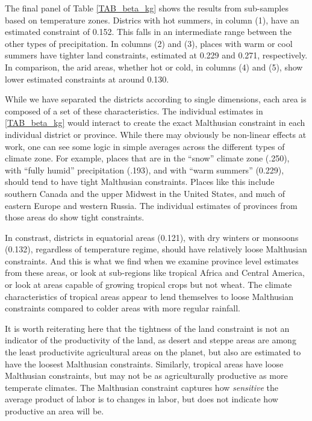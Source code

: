 \documentclass[11pt]{article}
\begin{document}
The final panel of Table \ref{TAB_beta_kg} shows the results from sub-samples based on temperature zones. Districs with hot summers, in column (1), have an estimated constraint of 0.152. This falls in an intermediate range between the other types of precipitation. In columns (2) and (3), places with warm or cool summers have tighter land constraints, estimated at 0.229 and 0.271, respectively. In comparison, the arid areas, whether hot or cold, in columns (4) and (5), show lower estimated constraints at around 0.130. 

While we have separated the districts according to single dimensions, each area is composed of a set of these characteristics. The individual estimates in \ref{TAB_beta_kg} would interact to create the exact Malthusian constraint in each individual district or province. While there may obviously be non-linear effects at work, one can see some logic in simple averages across the different types of climate zone. For example, places that are in the ``snow'' climate zone (.250), with ``fully humid'' precipitation (.193), and with ``warm summers'' (0.229), should tend to have tight Malthusian constraints. Places like this include southern Canada and the upper Midwest in the United States, and much of eastern Europe and western Russia. The individual estimates of provinces from those areas do show tight constraints.

In constrast, districts in equatorial areas (0.121), with dry winters or monsoons (0.132), regardless of temperature regime, should have relatively loose Malthusian constraints. And this is what we find when we examine province level estimates from these areas, or look at sub-regions like tropical Africa and Central America, or look at areas capable of growing tropical crops but not wheat. The climate characteristics of tropical areas appear to lend themselves to loose Malthusian constraints compared to colder areas with more regular rainfall. 

It is worth reiterating here that the tightness of the land constraint is not an indicator of the productivity of the land, as desert and steppe areas are among the least productivite agricultural areas on the planet, but also are estimated to have the loosest Malthusian constraints. Similarly, tropical areas have loose Malthusian constraints, but may not be as agriculturally productive as more temperate climates. The Malthusian constraint captures how \textit{sensitive} the average product of labor is to changes in labor, but does not indicate how productive an area will be.
\end{document}
